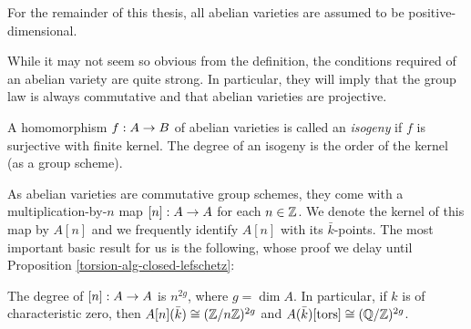 \begin{remark}
For the remainder of this thesis, all abelian varieties are assumed to be positive-dimensional.
\end{remark}

While it may not seem so obvious from the definition, the conditions required of an abelian variety are quite strong. In particular, they will imply that the group law is always commutative and that abelian varieties are projective.

\begin{definition}
A homomorphism $f:A\rightarrow B$ of abelian varieties is called an \emph{isogeny} if $f$ is surjective with finite kernel. The degree of an isogeny is the order of the kernel (as a group scheme).
\end{definition}

As abelian varieties are commutative group schemes, they come with a multiplication-by-$n$ map $[n]:A\rightarrow A$ for each $n\in\mathbb{Z}$. We denote the kernel of this map by $A[n]$ and we frequently identify $A[n]$ with its $\bar{k}$-points. The most important basic result for us is the following, whose proof we delay until Proposition \ref{torsion-alg-closed-lefschetz}:

\begin{proposition}
\label{torsion-alg-closed}
The degree of $[n]:A\rightarrow A$ is $n^{2g}$, where $g=\dim A$. In particular, if $k$ is of characteristic zero, then $A[n](\bar{k})\cong (\mathbb{Z}/n\mathbb{Z})^{2g}$ and $A(\bar{k})[\operatorname{tors}]\cong (\mathbb{Q}/\mathbb{Z})^{2g}$.
\end{proposition}
%

